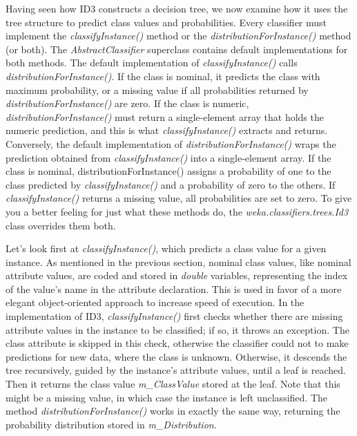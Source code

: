 Having seen how ID3 constructs a decision tree, we now examine how it
uses the tree structure to predict class values and
probabilities. Every classifier must implement the \textit{classifyInstance()}
method or the \textit{distributionForInstance()} method (or both). The
\textit{AbstractClassifier} superclass contains default implementations for both
methods. The default implementation of \textit{classifyInstance()} calls
\textit{distributionForInstance()}. If the class is nominal, it predicts the
class with maximum probability, or a missing value if all
probabilities returned by \textit{distributionForInstance()} are
zero. If the class is numeric, \textit{distributionForInstance()} must
return a single-element array that holds the numeric prediction, and
this is what \textit{classifyInstance()} extracts and
returns. Conversely, the default implementation
of \textit{distributionForInstance()} wraps the prediction obtained
from \textit{classifyInstance()} into a single-element array. If the
class is nominal, distributionForInstance() assigns a probability of
one to the class predicted by \textit{classifyInstance()} and a
probability of zero to the others. If \textit{classifyInstance()}
returns a missing value, all probabilities are set to zero. To give
you a better feeling for just what these methods do,
the \textit{weka.classifiers.trees.Id3} class overrides them both.


Let's look first at \textit{classifyInstance()}, which predicts a
class value for a given instance. As mentioned in the previous
section, nominal class values, like nominal attribute values, are
coded and stored in \textit{double} variables, representing the index
of the value's name in the attribute declaration. This is used in
favor of a more elegant object-oriented approach to increase speed of
execution. In the implementation of ID3, \textit{classifyInstance()}
first checks whether there are missing attribute values in the
instance to be classified; if so, it throws an exception. The class
attribute is skipped in this check, otherwise the classifier could not
to make predictions for new data, where the class is
unknown. Otherwise, it descends the tree recursively, guided by the
instance's attribute values, until a leaf is reached. Then it returns
the class value \textit{m\_ClassValue} stored at the leaf. Note that
this might be a missing value, in which case the instance is left
unclassified. The method \textit{distributionForInstance()} works in
exactly the same way, returning the probability distribution stored in
\textit{m\_Distribution}.

